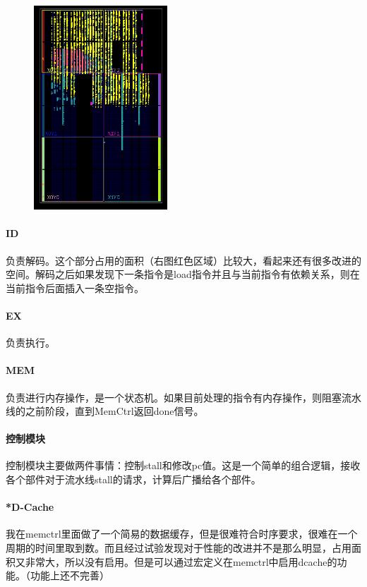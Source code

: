 \documentclass[UTF8]{ctexart}
\begin{document}
	\begin{figure}
		\includegraphics[width=5cm]{impl.png}
	\end{figure}
	
	\paragraph{ID} 负责解码。这个部分占用的面积（右图红色区域）比较大，看起来还有很多改进的空间。解码之后如果发现下一条指令是load指令并且与当前指令有依赖关系，则在当前指令后面插入一条空指令。
	

	
	\paragraph{EX} 负责执行。
	\paragraph{MEM} 负责进行内存操作，是一个状态机。如果目前处理的指令有内存操作，则阻塞流水线的之前阶段，直到MemCtrl返回done信号。
	\paragraph{控制模块} 控制模块主要做两件事情：控制stall和修改pc值。这是一个简单的组合逻辑，接收各个部件对于流水线stall的请求，计算后广播给各个部件。
	\paragraph{*D-Cache} 我在memctrl里面做了一个简易的数据缓存，但是很难符合时序要求，很难在一个周期的时间里取到数。而且经过试验发现对于性能的改进并不是那么明显，占用面积又非常大，所以没有启用。但是可以通过宏定义在memctrl中启用dcache的功能。（功能上还不完善）
	
\end{document}
